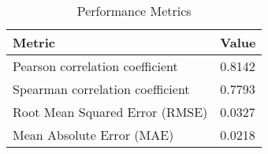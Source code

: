 \documentclass{article}
\begin{document}
    \begin{table}[h!]
    \centering
    \begin{tabular}{ll}
    \toprule
    Metric & Value \\
    \midrule
    Pearson correlation coefficient & 0.8142 \\
    Spearman correlation coefficient & 0.7793 \\
    Root Mean Squared Error (RMSE) & 0.0327 \\
    Mean Absolute Error (MAE) & 0.0218 \\
    \bottomrule
    \end{tabular}
    \caption{Performance Metrics}
    \label{tab:metrics}
    \end{table}

    
\end{document}
